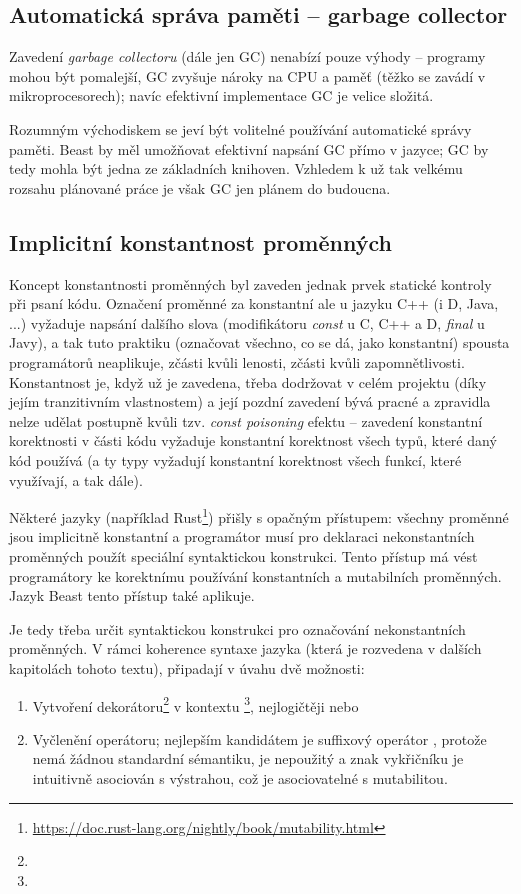 \subsection{Automatická správa paměti -- garbage collector}
Zavedení \textit{garbage collectoru} (dále jen GC) nenabízí pouze výhody \cite{GarbageCollectionHarmful} -- programy mohou být pomalejší, GC zvyšuje nároky na CPU a paměť (těžko se zavádí v mikroprocesorech); navíc efektivní implementace GC je velice složitá.

Rozumným východiskem se jeví být volitelné používání automatické správy paměti. Beast by měl umožňovat efektivní napsání GC přímo v jazyce; GC by tedy mohla být jedna ze základních knihoven. Vzhledem k už tak velkému rozsahu plánované práce je však GC jen plánem do budoucna.

\subsection{Implicitní konstantnost proměnných} \label{implicitConst}
Koncept konstantnosti proměnných byl zaveden jednak prvek statické kontroly při psaní kódu. Označení proměnné za konstantní ale u jazyku C++ (i D, Java, ...) vyžaduje napsání dalšího slova (modifikátoru \textit{const} u C, C++ a D, \textit{final} u Javy), a tak tuto praktiku (označovat všechno, co se dá, jako konstantní) spousta programátorů neaplikuje, zčásti kvůli lenosti, zčásti kvůli zapomnětlivosti. Konstantnost je, když už je zavedena, třeba dodržovat v celém projektu (díky jejím tranzitivním vlastnostem) a její pozdní zavedení bývá pracné a zpravidla nelze udělat postupně kvůli tzv. \textit{const poisoning} efektu -- zavedení konstantní korektnosti \cite{ConstCorrectness}\cite{ConstCorrectness2} v části kódu vyžaduje konstantní korektnost všech typů, které daný kód používá (a ty typy vyžadují konstantní korektnost všech funkcí, které využívají, a tak dále).

Některé jazyky (například Rust\footnote{\url{https://doc.rust-lang.org/nightly/book/mutability.html}}) přišly s opačným přístupem: všechny proměnné jsou implicitně konstantní a programátor musí pro deklaraci nekonstantních proměnných použít speciální syntaktickou konstrukci. Tento přístup má vést programátory ke korektnímu používání konstantních a mutabilních proměnných. Jazyk Beast tento přístup také aplikuje.

Je tedy třeba určit syntaktickou konstrukci pro označování nekonstantních proměnných. V rámci koherence syntaxe jazyka (která je rozvedena v dalších kapitolách tohoto textu), připadají  v úvahu dvě možnosti:
\begin{enumerate}
	\item Vytvoření dekorátoru\footnote{} v kontextu \footnote{}, nejlogičtěji  nebo 
	\item Vyčlenění operátoru; nejlepším kandidátem je suffixový operátor , protože nemá žádnou standardní sémantiku, je nepoužitý a znak vykřičníku je intuitivně asociován s výstrahou, což je asociovatelné s mutabilitou.
\end{enumerate}

